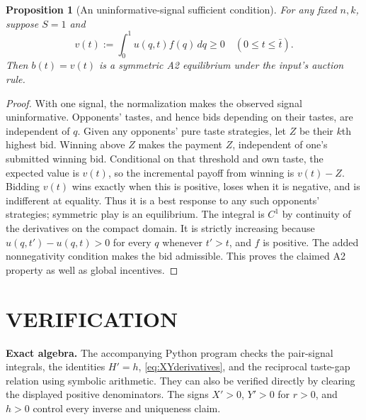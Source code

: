 \documentclass[11pt,a4paper]{article}
\newtheorem{proposition}[theorem]{Proposition}
\theoremstyle{remark}\newtheorem{remark}[theorem]{Remark}
\begin{document}
\begin{proposition}[An uninformative-signal sufficient condition]
For any fixed $n,k$, suppose $S=1$ and
\[
 v(t):=\int_0^1u(q,t)f(q)\,dq\ge0\quad(0\le t\le\bar t).
\]
Then $b(t)=v(t)$ is a symmetric A2 equilibrium under the input's auction rule.
\end{proposition}
\begin{proof}
With one signal, the normalization makes the observed signal uninformative. Opponents' tastes, and hence bids depending on their tastes, are independent of $q$. Given any opponents' pure taste strategies, let $Z$ be their $k$th highest bid. Winning above $Z$ makes the payment $Z$, independent of one's submitted winning bid. Conditional on that threshold and own taste, the expected value is $v(t)$, so the incremental payoff from winning is $v(t)-Z$. Bidding $v(t)$ wins exactly when this is positive, loses when it is negative, and is indifferent at equality. Thus it is a best response to any such opponents' strategies; symmetric play is an equilibrium. The integral is $C^1$ by continuity of the derivatives on the compact domain. It is strictly increasing because $u(q,t')-u(q,t)>0$ for every $q$ whenever $t'>t$, and $f$ is positive. The added nonnegativity condition makes the bid admissible. This proves the claimed A2 property as well as global incentives.
\end{proof}

\section{VERIFICATION}
\textbf{Exact algebra.} The accompanying Python program checks the pair-signal integrals, the identities $H'=h$, \eqref{eq:XYderivatives}, and the reciprocal taste-gap relation using symbolic arithmetic. They can also be verified directly by clearing the displayed positive denominators. The signs $X'>0$, $Y'>0$ for $r>0$, and $h>0$ control every inverse and uniqueness claim.
\end{document}
